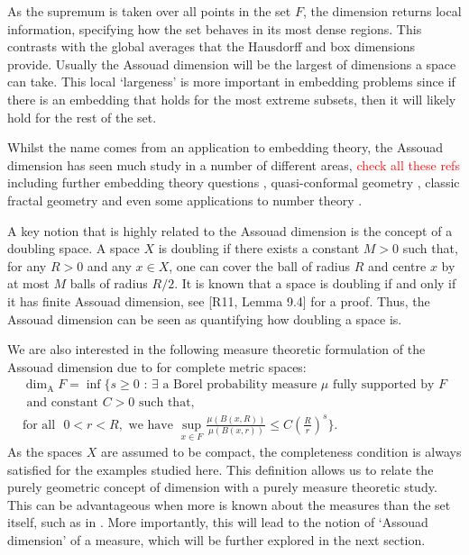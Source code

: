 As the supremum is taken over all points in the set $F$, the dimension returns local information, specifying how the set behaves in its most dense regions. This contrasts with the global averages that the Hausdorff and box dimensions provide. Usually the Assouad dimension will be the largest of dimensions a space can take. This local `largeness' is more important in embedding problems since if there is an embedding that holds for the most extreme subsets, then it will likely hold for the rest of the set. 

Whilst the name comes from an application to embedding theory, the Assouad dimension has seen much study in a number of different areas, \textcolor{red}{check all these refs} including further embedding theory questions \cite{olson02, olson10, robinson11}, quasi-conformal geometry \cite{heinonen, tyson, mckay-tyson}, classic fractal geometry \cite{fraser-todd, yu, troscheit, kaenmaki, orponen, etc} and even some applications to number theory \cite{fraser-yu, saito, etc }. 

A key notion that is highly related to the Assouad dimension is the concept of a doubling space. A space $X$ is doubling if there exists a constant $M > 0$ such that, for any $R > 0$ and any $x \in X$, one can cover the ball of radius $R$ and centre $x$ by at most $M$ balls of radius $R/2$. It is known that a space is doubling if and only if it has finite Assouad dimension, see \cite{robinson-book}[R11, Lemma 9.4] for a proof. Thus, the Assouad dimension can be seen as quantifying how doubling a space is.

We are also interested in the following measure theoretic formulation of the Assouad dimension due to \cite{luksak-saksman, konyagin-volberg} for complete metric spaces: 
\begin{multline*} 
\dim_{\text{A}} F = \inf \Bigg\{ s \geq 0 \, \,  : \, \exists \text{ a Borel probability measure } \mu \text{ fully supported by }F \\  \text{ and constant }C > 0\text{  such that,} \\ \text{for all } \, \, 0< r< R, \text{ we have  }  \sup_{x\in F} \frac{\mu(B(x,R))}{\mu(B(x,r))} \leq C\left(\frac{R}{r}\right)^{s} \Bigg\}.
\end{multline*}
As the spaces $X$ are assumed to be compact, the completeness condition is always satisfied for the examples studied here. This definition allows us to relate the purely geometric concept of dimension with a purely measure theoretic study. This can be advantageous when more is known about the measures than the set itself, such as in \cite{fraser-howroyd1}. More importantly, this will lead to the notion of `Assouad dimension' of a measure, which will be further explored in the next section. 


